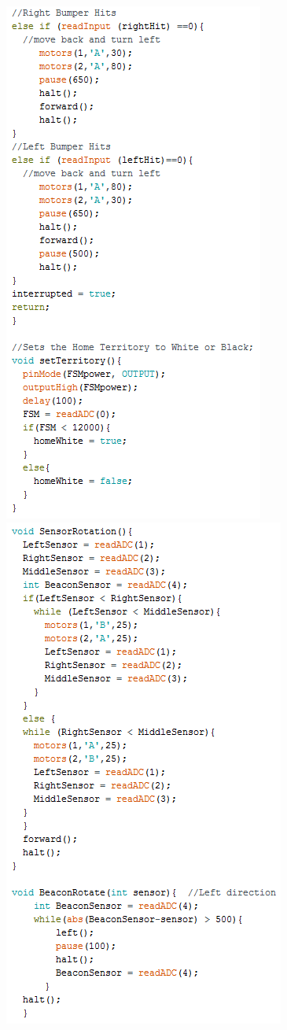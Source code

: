 \documentclass{article}
\begin{document}
\begin{center}
\includegraphics[]{FullCode3.png}
\includegraphics[]{FullCode4.png}

\end{center}
\end{document}
